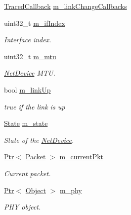 \begin{DoxyCompactItemize}
\hyperlink{classns3_1_1TracedCallback}{Traced\+Callback} \hyperlink{classns3_1_1AlohaNoackNetDevice_a018cc4ea94c6397c393dc4b222f055d4}{m\+\_\+link\+Change\+Callbacks}
\item 
uint32\+\_\+t \hyperlink{classns3_1_1AlohaNoackNetDevice_abc29097f76efbc9a13b536ca0db0b8d1}{m\+\_\+if\+Index}
\begin{DoxyCompactList}\small\item\em Interface index. \end{DoxyCompactList}\item 
uint32\+\_\+t \hyperlink{classns3_1_1AlohaNoackNetDevice_ac201ebc3d4057060bf1d32fdbf9bc567}{m\+\_\+mtu}
\begin{DoxyCompactList}\small\item\em \hyperlink{classns3_1_1NetDevice}{Net\+Device} M\+TU. \end{DoxyCompactList}\item 
bool \hyperlink{classns3_1_1AlohaNoackNetDevice_a184bb6fe30ad8c5550093712196a78a9}{m\+\_\+link\+Up}
\begin{DoxyCompactList}\small\item\em true if the link is up \end{DoxyCompactList}\item 
\hyperlink{classns3_1_1AlohaNoackNetDevice_adfe39ae2ca03685fc3dd2a78f9659b60}{State} \hyperlink{classns3_1_1AlohaNoackNetDevice_a97acfcda000e8ec80108cac43682cea0}{m\+\_\+state}
\begin{DoxyCompactList}\small\item\em State of the \hyperlink{classns3_1_1NetDevice}{Net\+Device}. \end{DoxyCompactList}\item 
\hyperlink{classns3_1_1Ptr}{Ptr}$<$ \hyperlink{classns3_1_1Packet}{Packet} $>$ \hyperlink{classns3_1_1AlohaNoackNetDevice_a52e093adfac997a02fea5ad86735c142}{m\+\_\+current\+Pkt}
\begin{DoxyCompactList}\small\item\em Current packet. \end{DoxyCompactList}\item 
\hyperlink{classns3_1_1Ptr}{Ptr}$<$ \hyperlink{classns3_1_1Object}{Object} $>$ \hyperlink{classns3_1_1AlohaNoackNetDevice_a3c72e3f13e37d6962828611dc5df189d}{m\+\_\+phy}
\begin{DoxyCompactList}\small\item\em P\+HY object. \end{DoxyCompactList}\end{DoxyCompactItemize}
